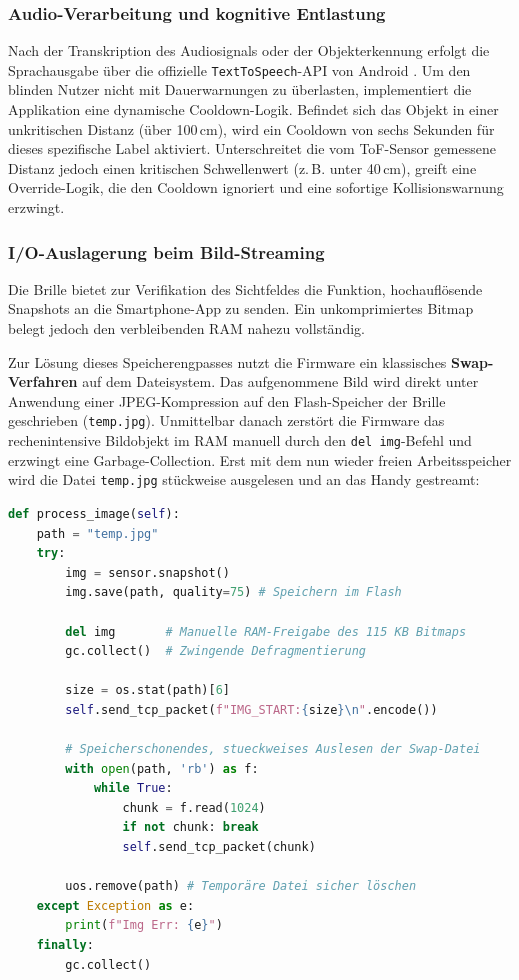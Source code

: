 \subsubsection*{Audio-Verarbeitung und kognitive Entlastung}
Nach der Transkription des Audiosignals oder der Objekterkennung erfolgt die Sprachausgabe über die offizielle \texttt{TextToSpeech}-API von Android \cite{android_tts}. Um den blinden Nutzer nicht mit Dauerwarnungen zu überlasten, implementiert die Applikation eine dynamische Cooldown-Logik. Befindet sich das Objekt in einer unkritischen Distanz (über 100\,cm), wird ein Cooldown von sechs Sekunden für dieses spezifische Label aktiviert. Unterschreitet die vom ToF-Sensor gemessene Distanz jedoch einen kritischen Schwellenwert (z.\,B. unter 40\,cm), greift eine Override-Logik, die den Cooldown ignoriert und eine sofortige Kollisionswarnung erzwingt.

\subsubsection*{I/O-Auslagerung beim Bild-Streaming}
Die Brille bietet zur Verifikation des Sichtfeldes die Funktion, hochauflösende Snapshots an die Smartphone-App zu senden. Ein unkomprimiertes Bitmap belegt jedoch den verbleibenden RAM nahezu vollständig. 

Zur Lösung dieses Speicherengpasses nutzt die Firmware ein klassisches \textbf{Swap-Verfahren} auf dem Dateisystem. Das aufgenommene Bild wird direkt unter Anwendung einer JPEG-Kompression auf den Flash-Speicher der Brille geschrieben (\texttt{temp.jpg}). Unmittelbar danach zerstört die Firmware das rechenintensive Bildobjekt im RAM manuell durch den \texttt{del img}-Befehl und erzwingt eine Garbage-Collection. Erst mit dem nun wieder freien Arbeitsspeicher wird die Datei \texttt{temp.jpg} stückweise ausgelesen und an das Handy gestreamt:

\begin{lstlisting}[language=Python, caption={Verwendung des Flash-Speichers als Swap zur Vermeidung von OOM-Exceptions}]
def process_image(self):
    path = "temp.jpg"
    try:
        img = sensor.snapshot()
        img.save(path, quality=75) # Speichern im Flash
        
        del img       # Manuelle RAM-Freigabe des 115 KB Bitmaps
        gc.collect()  # Zwingende Defragmentierung
        
        size = os.stat(path)[6]
        self.send_tcp_packet(f"IMG_START:{size}\n".encode())
        
        # Speicherschonendes, stueckweises Auslesen der Swap-Datei
        with open(path, 'rb') as f:
            while True:
                chunk = f.read(1024)
                if not chunk: break
                self.send_tcp_packet(chunk)
                
        uos.remove(path) # Temporäre Datei sicher löschen
    except Exception as e:
        print(f"Img Err: {e}")
    finally:
        gc.collect()
\end{lstlisting}

